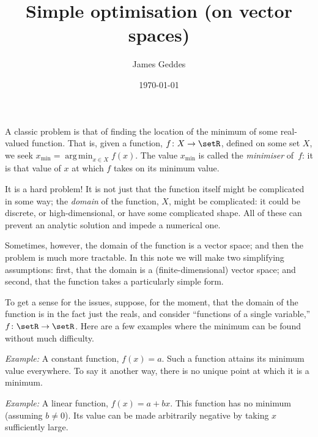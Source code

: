 \documentclass[10pt, a4paper]{article}
\title{Simple optimisation (on vector spaces)}
\author{James Geddes}
\date{\today}
\DeclareMathOperator*{\argmin}{arg\,min}
\newcommand{\eg}{\emph{Example:}}
\begin{document}
\maketitle

A classic problem is that of finding the location of the minimum of
some real-valued function. That is, given a function,
$f\colon X\to\setR$, defined on some set $X$, we seek
$x_\text{min} = \argmin_{x\in X} f(x)$. The value $x_\text{min}$ is
called the \emph{minimiser} of~$f$: it is that value of $x$ at which
$f$ takes on its minimum value.

It is a hard problem! It is not just that the function itself might be
complicated in some way; the \emph{domain} of the function, $X$, might
be complicated: it could be discrete, or high-dimensional, or have
some complicated shape. All of these can prevent an analytic solution
and impede a numerical one.

Sometimes, however, the domain of the function is a vector space; and
then the problem is much more tractable. In this note we will make two
simplifying assumptions: first, that the domain is a
(finite-dimensional) vector space; and second, that the function takes
a particularly simple form.

To get a sense for the issues, suppose, for the moment, that the
domain of the function is in the fact just the reals, and consider
“functions of a single variable,” $f\colon \setR\to\setR$. Here are a
few examples where the minimum can be found without much difficulty.

\eg{} A constant function, $f(x) = a$. Such a function attains its
minimum value everywhere. To say it another way, there is no unique
point at which it is a minimum.

\eg{} A linear function,
$f(x) = a + bx$. This function has no minimum (assuming $b\neq0$). Its
value can be made arbitrarily negative by taking $x$ sufficiently
large.
\end{document}
